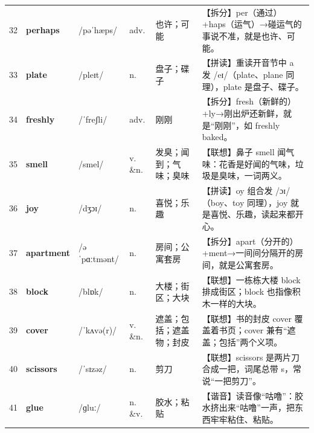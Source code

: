 \documentclass[UTF8,a4paper,11pt,oneside]{ctexbook}
\newcommand{\cellword}[1]{{\bfseries\textcolor{wordcol}{#1}}}
\newcommand{\cellipa}[1]{{\footnotesize\textcolor{ipacol}{#1}}}
\newcommand{\cellpos}[1]{\textcolor{poscol}{#1}}
\newcommand{\cellno}[1]{\textcolor{volcolor!75!black}{#1}}
\begin{document}
{\begin{longtable}{@{}C{0.045\textwidth}L{0.155\textwidth}L{0.175\textwidth}C{0.070\textwidth}L{0.180\textwidth}L{0.282\textwidth}@{}}
\cellno{32} & \cellword{perhaps} & \cellipa{/pəˈhæps/} & \cellpos{adv.} & 也许；可能 & \textcolor{tagSplit}{【拆分】}per（通过）+haps（运气）→\allowbreak{}碰运气的事说不准，就是也许、可能。 \\
 \cellno{33} & \cellword{plate} & \cellipa{/pleɪt/} & \cellpos{n.} & 盘子；碟子 & \textcolor{tagSpell}{【拼读】}重读开音节中 a 发 /eɪ/（plate、plane 同理），plate 是盘子、碟子。 \\
\cellno{34} & \cellword{freshly} & \cellipa{/ˈfreʃli/} & \cellpos{adv.} & 刚刚 & \textcolor{tagSplit}{【拆分】}fresh（新鲜的）+ly→\allowbreak{}刚出炉还新鲜，就是“刚刚”，如 freshly baked。 \\
 \cellno{35} & \cellword{smell} & \cellipa{/smel/} & \cellpos{v. \&n.} & 发臭；闻到；气味；臭味 & \textcolor{tagAssoc}{【联想】}鼻子 smell 闻气味：花香是好闻的气味，垃圾是臭味，一词两义。 \\
\cellno{36} & \cellword{joy} & \cellipa{/dʒɔɪ/} & \cellpos{n.} & 喜悦；乐趣 & \textcolor{tagSpell}{【拼读】}oy 组合发 /ɔɪ/（boy、toy 同理），joy 就是喜悦、乐趣，读起来都开心。 \\
 \cellno{37} & \cellword{apartment} & \cellipa{/əˈpɑːtmənt/} & \cellpos{n.} & 房间；公寓套房 & \textcolor{tagSplit}{【拆分】}apart（分开的）+ment→\allowbreak{}一间间分隔开的房间，就是公寓套房。 \\
\cellno{38} & \cellword{block} & \cellipa{/blɒk/} & \cellpos{n.} & 大楼；街区；大块 & \textcolor{tagAssoc}{【联想】}一栋栋大楼 block 排成街区；block 也指像积木一样的大块。 \\
 \cellno{39} & \cellword{cover} & \cellipa{/ˈkʌvə(r)/} & \cellpos{v. \&n.} & 遮盖；包括；遮盖物；封皮 & \textcolor{tagAssoc}{【联想】}书的封皮 cover 覆盖着书页；cover 兼有“遮盖；包括”两个义项。 \\
\cellno{40} & \cellword{scissors} & \cellipa{/ˈsɪzəz/} & \cellpos{n.} & 剪刀 & \textcolor{tagAssoc}{【联想】}scissors 是两片刀合成一把，词尾总带 s，常说“一把剪刀”。 \\
 \cellno{41} & \cellword{glue} & \cellipa{/ɡluː/} & \cellpos{n. \&v.} & 胶水；粘贴 & \textcolor{tagSound}{【谐音】}读音像“咕噜”：胶水挤出来“咕噜”一声，把东西牢牢粘住、粘贴。 \\
\end{longtable}
}

\end{document}

